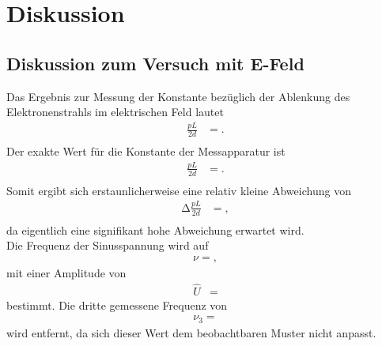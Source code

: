 \section{Diskussion}
\label{sec:Diskussion}

\subsection{Diskussion zum Versuch mit E-Feld}
Das Ergebnis zur Messung der Konstante bezüglich der Ablenkung des Elektronenstrahls im elektrischen Feld lautet
\begin{align*}
  \frac{pL}{2d} &= . \\
\end{align*}
Der exakte Wert für die Konstante der Messapparatur ist
\begin{align*}
  \frac{pL}{2d} &= . \\
\end{align*}
Somit ergibt sich erstaunlicherweise eine relativ kleine Abweichung von
\begin{align*}
  \increment{\frac{pL}{2d}} &= , \\
\end{align*}
da eigentlich eine signifikant hohe Abweichung erwartet wird.\\
Die Frequenz der Sinusspannung wird auf
\begin{align*}
  \nu = ,
\end{align*}
mit einer Amplitude von
\begin{align*}
  \hat{U} &= 
\end{align*}
bestimmt.
Die dritte gemessene Frequenz von
\begin{align*}
  \nu_3 = 
\end{align*}
wird entfernt, da sich dieser Wert dem beobachtbaren Muster nicht anpasst.

